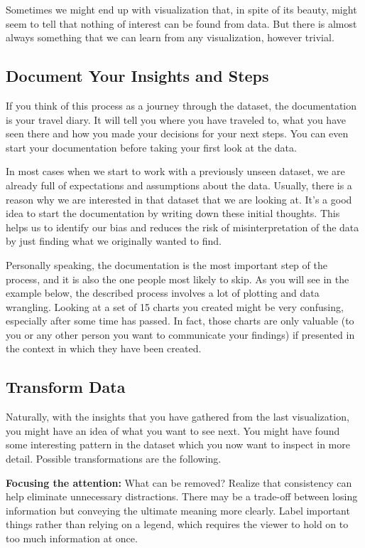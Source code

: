 \documentclass[]{book}
\begin{document}
Sometimes we might end up with visualization that, in spite of its
beauty, might seem to tell that nothing of interest can be found from
data. But there is almost always something that we can learn from any
visualization, however trivial.

\subsection{Document Your Insights and
Steps}\label{document-your-insights-and-steps}

If you think of this process as a journey through the dataset, the
documentation is your travel diary. It will tell you where you have
traveled to, what you have seen there and how you made your decisions
for your next steps. You can even start your documentation before taking
your first look at the data.

In most cases when we start to work with a previously unseen dataset, we
are already full of expectations and assumptions about the data.
Usually, there is a reason why we are interested in that dataset that we
are looking at. It's a good idea to start the documentation by writing
down these initial thoughts. This helps us to identify our bias and
reduces the risk of misinterpretation of the data by just finding what
we originally wanted to find.

Personally speaking, the documentation is the most important step of the
process, and it is also the one people most likely to skip. As you will
see in the example below, the described process involves a lot of
plotting and data wrangling. Looking at a set of 15 charts you created
might be very confusing, especially after some time has passed. In fact,
those charts are only valuable (to you or any other person you want to
communicate your findings) if presented in the context in which they
have been created.

\subsection{Transform Data}\label{transform-data}

Naturally, with the insights that you have gathered from the last
visualization, you might have an idea of what you want to see next. You
might have found some interesting pattern in the dataset which you now
want to inspect in more detail. Possible transformations are the
following.

\textbf{Focusing the attention:} What can be removed? Realize that
consistency can help eliminate unnecessary distractions. There may be a
trade-off between losing information but conveying the ultimate meaning
more clearly. Label important things rather than relying on a legend,
which requires the viewer to hold on to too much information at once.
\end{document}
